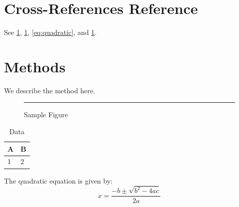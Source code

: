 \documentclass{article}
\begin{document}
\section*{Cross-References Reference}
See \cref{fig:sample}, \cref{tab:data}, \cref{eq:quadratic}, and \cref{sec:methods}.

\section{Methods}\label{sec:methods}
We describe the method here.

\begin{figure}[h]
\centering
\rule{5cm}{3cm}
\caption{Sample Figure}\label{fig:sample}
\end{figure}

\begin{table}[h]
\centering
\caption{Data}\label{tab:data}
\begin{tabular}{ll}
\toprule
A & B \\
\midrule
1 & 2 \\
\bottomrule
\end{tabular}
\end{table}

The quadratic equation is given by:
\begin{equation}
\label{eq:quadratic}
x = \frac{-b \pm \sqrt{b^2 - 4ac}}{2a}
\end{equation}
\end{document}
